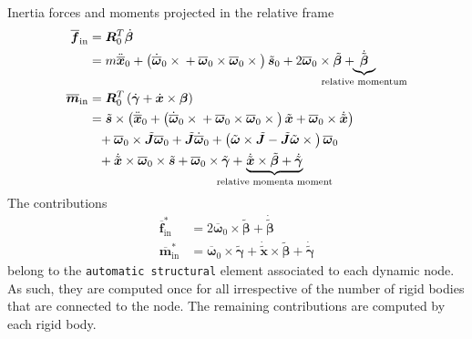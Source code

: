 \documentclass[10pt,fleqn,subeqn]{report}
\newcommand{\T}[1]{\bm{#1}}
\newcommand{\TT}[1]{\bm{#1}}
\begin{document}
Inertia forces and moments projected in the relative frame
\begin{subequations}
\begin{align}
	\overline{\T{f}}_{\text{in}}
	&= \TT{R}_0^T \dot{\T{\beta}}
	\nonumber \\
	&= m \ddot{\overline{\T{x}}}_0
	+ \plbr{
		\dot{\overline{\T{\omega}}}_0 \times{}
		+ \overline{\T{\omega}}_0 \times \overline{\T{\omega}}_0 \times{}
	} \tilde{\T{s}}_0
	+ 2 \overline{\T{\omega}}_0 \times \tilde{\T{\beta}}
	+ \hspace{-10mm}\underbrace{\dot{\tilde{\T{\beta}}}}_{\text{relative momentum}} \\
%
	\overline{\T{m}}_{\text{in}}
	&= \TT{R}_0^T \plbr{\dot{\T{\gamma}} + \dot{\T{x}} \times \T{\beta}}
	\nonumber \\
	&= \tilde{\T{s}} \times \plbr{
		\ddot{\overline{\T{x}}}_0
		+ \plbr{
			\dot{\overline{\T{\omega}}}_0 \times{}
			+ \overline{\T{\omega}}_0 \times \overline{\T{\omega}}_0 \times{}
		} \tilde{\T{x}}
		+ \overline{\T{\omega}}_0 \times \dot{\tilde{\T{x}}}
	}
	\nonumber \\
	&\hphantom{=}+ \overline{\T{\omega}}_0 \times \tilde{\TT{J}} \overline{\T{\omega}}_0
	+ \tilde{\TT{J}} \dot{\overline{\T{\omega}}}_0
	+ \plbr{
		\tilde{\T{\omega}} \times \tilde{\TT{J}}
		- \tilde{\TT{J}} \tilde{\T{\omega}} \times{}
	} \overline{\T{\omega}}_0
	\nonumber \\
	&\hphantom{=}
	+ \dot{\tilde{\T{x}}} \times \overline{\T{\omega}}_0 \times \tilde{\T{s}}
	+ \overline{\T{\omega}}_0 \times \tilde{\T{\gamma}}
	+ \hspace{-8mm}\underbrace{
		\dot{\tilde{\T{x}}} \times \tilde{\T{\beta}}
		+ \dot{\tilde{\T{\gamma}}}
	}_{\text{relative momenta moment}}
\end{align}
\end{subequations}
The contributions
\begin{subequations}
\begin{align}
	\overline{\T{f}}_{\text{in}}^*
	&= 2 \overline{\T{\omega}}_0 \times \tilde{\T{\beta}}
	+ \dot{\tilde{\T{\beta}}} \\
%
	\overline{\T{m}}_{\text{in}}^*
	&= \overline{\T{\omega}}_0 \times \tilde{\T{\gamma}}
	+ \dot{\tilde{\T{x}}} \times \tilde{\T{\beta}}
	+ \dot{\tilde{\T{\gamma}}}
\end{align}
\end{subequations}
belong to the \texttt{automatic structural} element associated
to each dynamic node.
As such, they are computed once for all irrespective of the number
of rigid bodies that are connected to the node.
The remaining contributions are computed by each rigid body.
\end{document}

